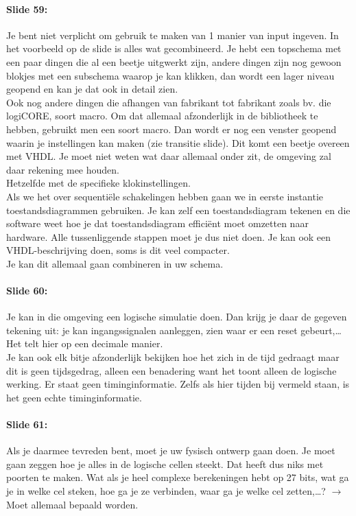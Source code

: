 \documentclass[10pt,a4paper]{book}
\begin{document}
\paragraph{Slide 59:} Je bent niet verplicht om gebruik te maken van 1 manier van input ingeven. In het voorbeeld op de slide is alles wat gecombineerd. Je hebt een topschema met een paar dingen die al een beetje uitgwerkt zijn, andere dingen zijn nog gewoon blokjes met een subschema waarop je kan klikken, dan wordt een lager niveau geopend en kan je dat ook in detail zien. \\
Ook nog andere dingen die afhangen van fabrikant tot fabrikant zoals bv. die logiCORE, soort macro.  Om dat allemaal afzonderlijk in de bibliotheek te hebben, gebruikt men een soort macro. Dan wordt er nog een venster geopend waarin je instellingen kan maken (zie transitie slide). Dit komt een beetje overeen met VHDL. Je moet niet weten wat daar allemaal onder zit, de omgeving zal daar rekening mee houden.\\
Hetzelfde met de specifieke klokinstellingen. \\
Als we het over sequenti\"ele schakelingen hebben gaan we in eerste instantie toestandsdiagrammen gebruiken. Je kan zelf een toestandsdiagram tekenen en die software weet hoe je dat toestandsdiagram effici\"ent moet omzetten naar hardware. Alle tussenliggende stappen moet je dus niet doen. Je kan ook een VHDL-beschrijving doen, soms is dit veel compacter.\\
Je kan dit allemaal gaan combineren in uw schema.

\paragraph{Slide 60:} Je kan in die omgeving een logische simulatie doen. Dan krijg je daar de gegeven tekening uit: je kan ingangssignalen aanleggen, zien waar er een reset gebeurt,\ldots Het telt hier op een decimale manier.\\
Je kan ook elk bitje afzonderlijk bekijken hoe het zich in de tijd gedraagt maar dit is geen tijdsgedrag, alleen een benadering want het toont alleen de logische werking. Er staat geen timinginformatie. Zelfs als hier tijden bij vermeld staan, is het geen echte timinginformatie.

\paragraph{Slide 61:} Als je daarmee tevreden bent, moet je uw fysisch ontwerp gaan doen. Je moet gaan zeggen hoe je alles in de logische cellen steekt. Dat heeft dus niks met poorten te maken. Wat als je heel complexe berekeningen hebt op 27 bits, wat ga je in welke cel steken, hoe ga je ze verbinden, waar ga je welke cel zetten,\ldots ? $\rightarrow$ Moet allemaal bepaald worden.
\end{document}
